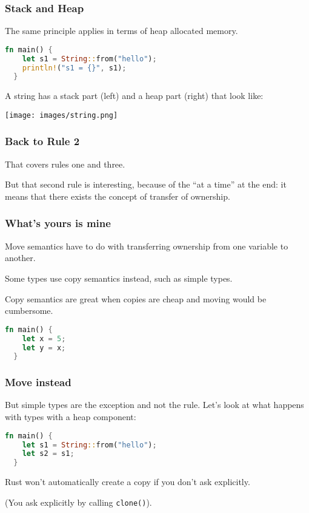 \begin{frame}[fragile]
\frametitle{Stack and Heap}

The same principle applies in terms of heap allocated memory.


\begin{lstlisting}[language=Rust]
  fn main() {
    let s1 = String::from("hello");
    println!("s1 = {}", s1);
  }
\end{lstlisting}

A string has a stack part (left) and a heap part (right) that look like:
\begin{center}
\texttt{[image: images/string.png]} 
\end{center}

\end{frame}


\begin{frame}
\frametitle{Back to Rule 2}

That covers rules one and three.

But that second rule is interesting, because of the ``at a time'' at the end: it means that there exists the concept of transfer of ownership.


\end{frame}

\begin{frame}[fragile]
\frametitle{What's yours is mine}

Move semantics have to do with transferring ownership from one variable to another.

Some types use copy semantics instead, such as simple types.

Copy semantics are great when copies are cheap and moving would be cumbersome. 

\begin{lstlisting}[language=Rust]
  fn main() {
   	let x = 5;
	let y = x;
  }
\end{lstlisting}


\end{frame}

\begin{frame}[fragile]
\frametitle{Move instead}

But simple types are the exception and not the rule. Let's look at what happens with types with a heap component:

\begin{lstlisting}[language=Rust]
  fn main() {
    let s1 = String::from("hello");
    let s2 = s1;
  }
\end{lstlisting}


Rust won't automatically create a copy if you don't ask explicitly. 

(You ask explicitly by calling \texttt{clone()}).

\end{frame}


